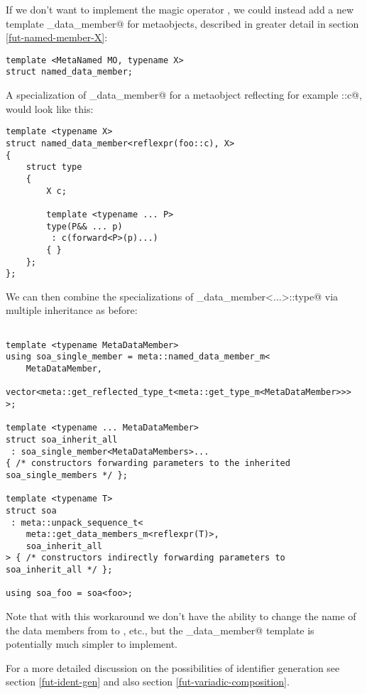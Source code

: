 If we don't want to implement the magic operator \verb@idreflexpr@,
we could instead add a new template \verb@named_data_member@
for  metaobjects, described in greater detail in section
\ref{fut-named-member-X}:

\begin{verbatim}
template <MetaNamed MO, typename X>
struct named_data_member;
\end{verbatim}

A specialization of \verb@named_data_member@ for a metaobject reflecting
for example \verb@foo::c@, would look like this:

\begin{verbatim}
template <typename X>
struct named_data_member<reflexpr(foo::c), X>
{
	struct type
	{
		X c;

		template <typename ... P>
		type(P&& ... p)
		 : c(forward<P>(p)...) 
		{ }
	};
};
\end{verbatim}

We can then combine the specializations of \verb@named_data_member<...>::type@
via multiple inheritance as before:

\begin{verbatim}

template <typename MetaDataMember>
using soa_single_member = meta::named_data_member_m<
	MetaDataMember,
	vector<meta::get_reflected_type_t<meta::get_type_m<MetaDataMember>>>
>;

template <typename ... MetaDataMember>
struct soa_inherit_all
 : soa_single_member<MetaDataMembers>...
{ /* constructors forwarding parameters to the inherited soa_single_members */ };

template <typename T>
struct soa
 : meta::unpack_sequence_t<
	meta::get_data_members_m<reflexpr(T)>,
	soa_inherit_all
> { /* constructors indirectly forwarding parameters to soa_inherit_all */ };

using soa_foo = soa<foo>;
\end{verbatim}

Note that with this workaround we don't have the ability to change the name
of the data members from \verb@c@ to \verb@cs@, etc., but the \verb@named_data_member@
template is potentially much simpler to implement.

For a more detailed discussion on the possibilities of identifier generation
see section \ref{fut-ident-gen} and also section \ref{fut-variadic-composition}.
